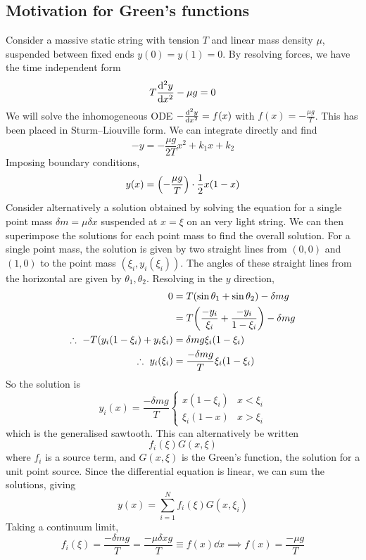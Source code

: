\subsection{Motivation for Green's functions}
Consider a massive static string with tension \( T \) and linear mass density \( \mu \), suspended between fixed ends \( y(0) = y(1) = 0 \).
By resolving forces, we have the time independent form
\[
	T \dv[2]{y}{x} - \mu g = 0
\]
We will solve the inhomogeneous ODE \( - \dv[2]{y}{x} = f(x) \) with \( f(x) = -\frac{\mu g}{T} \).
This has been placed in Sturm--Liouville form.
We can integrate directly and find
\[
	-y = -\frac{\mu g}{2T} x^2 + k_1 x + k_2
\]
Imposing boundary conditions,
\[
	y(x) = \qty(-\frac{\mu g}{T}) \cdot \frac{1}{2}x(1-x)
\]
Consider alternatively a solution obtained by solving the equation for a single point mass \( \delta m = \mu \delta x \) suspended at \( x = \xi \) on an very light string.
We can then superimpose the solutions for each point mass to find the overall solution.
For a single point mass, the solution is given by two straight lines from \( (0,0) \) and \( (1,0) \) to the point mass \( (\xi_i, y_i(\xi_i)) \).
The angles of these straight lines from the horizontal are given by \( \theta_1, \theta_2 \).
Resolving in the \( y \) direction,
\begin{align*}
	0                                           & = T (\sin \theta_1 + \sin \theta_2) - \delta m g                \\
	                                            & = T\qty(\frac{-y_i}{\xi_i} + \frac{-y_i}{1-\xi_i}) - \delta m g \\
	\therefore\ -T\qty(y_i(1-\xi_i) + y_i \xi_i) & = \delta m g \xi_i(1-\xi_i)                                     \\
	\therefore\ y_i(\xi_i)                       & = \frac{-\delta m g}{T} \xi_i (1-\xi_i)
\end{align*}
So the solution is
\[
	y_i(x) = \frac{-\delta m g}{T} \begin{cases}
		x(1-\xi_i)    & x < \xi_i \\
		\xi_i (1 - x) & x > \xi_i
	\end{cases}
\]
which is the generalised sawtooth.
This can alternatively be written
\[
	f_i(\xi) G(x,\xi)
\]
where \( f_i \) is a source term, and \( G(x,\xi) \) is the Green's function, the solution for a unit point source.
Since the differential equation is linear, we can sum the solutions, giving
\[
	y(x) = \sum_{i=1}^N f_i(\xi) G(x, \xi_i)
\]
Taking a continuum limit,
\[
	f_i(\xi) = \frac{-\delta m g}{T} = \frac{-\mu \delta x g}{T} \equiv f(x) \dd{x} \implies f(x) = \frac{-\mu g}{T}
\]
